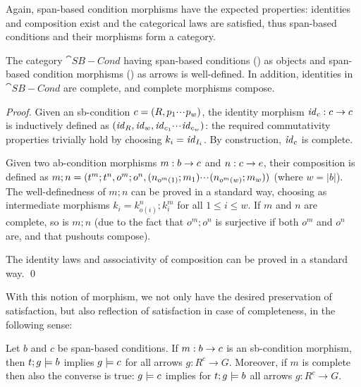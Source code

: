 \medskip\noindent Again, span-based condition morphisms have the expected properties: identities and composition exist and the categorical laws are satisfied, thus span-based conditions and their morphisms form a category.

\begin{proposition}
  The category $\cat{SB-Cond}$ having span-based conditions () as objects and span-based condition morphisms () as arrows is well-defined. In addition, identities in $\cat{SB-Cond}$ are complete, and complete morphisms compose.
\end{proposition}
 
\begin{proof}
  Given an sb-condition $c=(R,p_1{\cdotp\mkern-2mu\cdotp\mkern-2mu\cdotp\mkern1mu} p_w)$, the identity morphism $\mathit{id}_c:c\rightarrow c$ is inductively defined as $(\mathit{id}_R,\mathit{id}_w,\mathit{id}_{c_1}{\cdotp\mkern-2mu\cdotp\mkern-2mu\cdotp\mkern1mu} \mathit{id}_{c_w})$: the required commutativity properties trivially hold by choosing $k_i=\mathit{id}_{I_i}$. By construction, $\mathit{id}_c$ is complete.
  
Given two ab-condition morphisms $m:b\rightarrow c$ and $n:c\rightarrow e$, their composition is defined as $m;n=(t^m;t^n,o^m;o^n,(n_{o^m(1)};m_1){\cdotp\mkern-2mu\cdotp\mkern-2mu\cdotp\mkern1mu} (n_{o^m(w)};m_{w}))$ (where $w=|b|$).
The well-definedness of $m;n$ can be proved in a standard way, choosing as intermediate morphisms $k_i=k^n_{o(i)};k^m_i$ for all $1\leq i\leq w$. If $m$ and $n$ are complete, so is $m;n$ (due to the fact that $o^m;o^n$ is surjective if both $o^m$ and $o^n$ are, and that pushouts compose).

The identity laws and associativity of composition can be proved in a standard way. \qed
\end{proof}
%
With this notion of morphism, we not only have the desired preservation of satisfaction, but also reflection of satisfaction in case of completeness, in the following sense:
%
\begin{proposition}
Let $b$ and $c$ be span-based conditions. If $m:b\rightarrow c$ is an sb-condition morphism, then $t;g\models b$ implies $g\models c$ for all arrows $g:R^c\to G$. Moreover, if $m$ is complete then also the converse is true: $g\models c$ implies for $t;g\models b$ all arrows $g:R^c\to G$.
\end{proposition}
%
